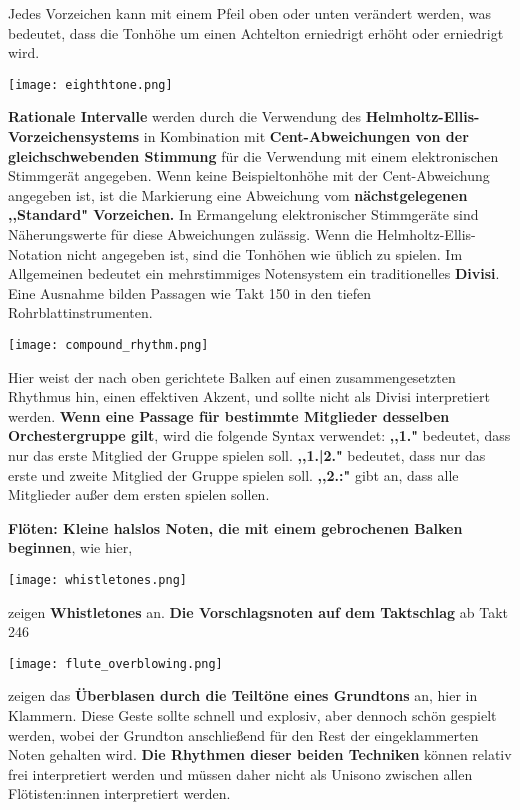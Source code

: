 \documentclass[12pt]{article}
\newcommand*\circled[1]{\tikz[baseline=(char.base)]{
            \node[shape=circle,draw,inner sep=1pt] (char) {#1};}}
\begin{document}
\begingroup
\circled{3} Jedes Vorzeichen kann mit einem Pfeil oben oder unten verändert werden, was bedeutet, dass die Tonhöhe um einen Achtelton erniedrigt erhöht oder erniedrigt wird. \\
\begin{center}
\texttt{[image: eighthtone.png]}
\end{center}
\endgroup

\begingroup
\textbf{\circled{11} Rationale Intervalle} werden durch die Verwendung des \textbf{Helmholtz-Ellis-Vorzeichensystems} in Kombination mit \textbf{Cent-Abweichungen von der gleichschwebenden Stimmung} für die Verwendung mit einem elektronischen Stimmgerät angegeben. Wenn keine Beispieltonhöhe mit der Cent-Abweichung angegeben ist, ist die Markierung eine Abweichung vom \textbf{nächstgelegenen ,,Standard" Vorzeichen.} In Ermangelung elektronischer Stimmgeräte sind Näherungswerte für diese Abweichungen zulässig. Wenn die Helmholtz-Ellis-Notation nicht angegeben ist, sind die Tonhöhen wie üblich zu spielen. \textbf{\circled{12}}  Im Allgemeinen bedeutet ein mehrstimmiges Notensystem ein traditionelles \textbf{Divisi}. Eine Ausnahme bilden Passagen wie Takt 150 in den tiefen Rohrblattinstrumenten. \\
\begin{center}
\texttt{[image: compound\_rhythm.png]}
\end{center}
Hier weist der nach oben gerichtete Balken auf einen zusammengesetzten Rhythmus hin, einen effektiven Akzent, und sollte nicht als Divisi interpretiert werden. \textbf{\circled{13} Wenn eine Passage für bestimmte Mitglieder desselben Orchestergruppe gilt}, wird die folgende Syntax verwendet: \textbf{,,1."} bedeutet, dass nur das erste Mitglied der Gruppe spielen soll. \textbf{,,1.|2."} bedeutet, dass nur das erste und zweite Mitglied der Gruppe spielen soll. \textbf{,,2.:"} gibt an, dass alle Mitglieder außer dem ersten spielen sollen.
\endgroup

\begingroup
\textbf{Flöten: \circled{1} Kleine halslos Noten, die mit einem gebrochenen Balken beginnen}, wie hier, \\
\begin{center}
\texttt{[image: whistletones.png]}
\end{center}
zeigen \textbf{Whistletones} an. \textbf{\circled{2} Die Vorschlagsnoten auf dem Taktschlag} ab Takt 246 \\
\begin{center}
\texttt{[image: flute\_overblowing.png]}
\end{center}
zeigen das \textbf{Überblasen durch die Teiltöne eines Grundtons} an, hier in Klammern. Diese Geste sollte schnell und explosiv, aber dennoch schön gespielt werden, wobei der Grundton anschließend für den Rest der eingeklammerten Noten gehalten wird. \textbf{\circled{3} Die Rhythmen dieser beiden Techniken} können relativ frei interpretiert werden und müssen daher nicht als Unisono zwischen allen Flötisten:innen interpretiert werden.
\endgroup
\end{document}
